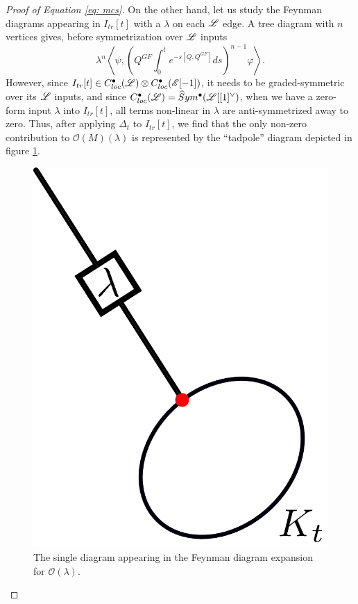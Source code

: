 \documentclass[11pt]{amsart}
\newcommand{\E}{\mscr{E}}
\newcommand{\mscr}{\mathscr}
\numberwithin{equation}{section}
\begin{document}
\begin{proof}[Proof of Equation \ref{eq: mcs}]
On the other hand, let us study the Feynman diagrams appearing in $I_{tr}[t]$ with a $\lambda$ on each $\mathscr L$ edge. A tree diagram with $n$ vertices gives, before symmetrization over $\mathscr L$ inputs
\[
\lambda^n\left \langle \psi, \left(Q^{GF}\int_0^t e^{-s[Q,Q^{GF}]}ds\right)^{n-1} \varphi\right \rangle.
\]
However, since $I_{tr}[t]\in C^\bullet_{loc}(\sL)\otimes  C^\bullet_{loc}(\E[-1])$, it needs to be graded-symmetric over its $\mathscr L$ inputs, and since $C^\bullet_{loc}(\mathscr L)= \widehat Sym^\bullet (\mathscr L[[1]^\vee)$, when we have a zero-form input $\lambda$ into $I_{tr}[t]$, all terms non-linear in $\lambda$ are anti-symmetrized away to zero. Thus, after applying $\Delta_t$ to $I_{tr}[t]$, we find that the only non-zero contribution to $\mathscr O(M)(\lambda)$ is represented by the ``tadpole'' diagram depicted in figure \ref{fig: tadpole}.
\begin{figure}[h]
\label{fig: tadpole}
\includegraphics[scale = 0.5]{Tadpole}
\caption{The single diagram appearing in the Feynman diagram expansion for $\mathcal O(\lambda)$.}
\end{figure}


\end{proof}
\end{document}
